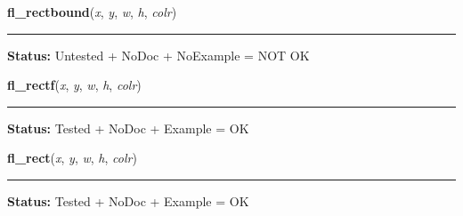     \vspace{0.5ex}

\hspace{.8\funcindent}\begin{boxedminipage}{\funcwidth}

    \raggedright \textbf{fl\_rectbound}(\textit{x}, \textit{y}, \textit{w}, \textit{h}, \textit{colr})

    \vspace{-1.5ex}

    \rule{\textwidth}{0.5\fboxrule}
\setlength{\parskip}{2ex}
\setlength{\parskip}{1ex}
\textbf{Status:} Untested + NoDoc + NoExample = NOT OK



    \end{boxedminipage}

    \label{xformslib:library:fl_rectf}

    \vspace{0.5ex}

\hspace{.8\funcindent}\begin{boxedminipage}{\funcwidth}

    \raggedright \textbf{fl\_rectf}(\textit{x}, \textit{y}, \textit{w}, \textit{h}, \textit{colr})

    \vspace{-1.5ex}

    \rule{\textwidth}{0.5\fboxrule}
\setlength{\parskip}{2ex}
\setlength{\parskip}{1ex}
\textbf{Status:} Tested + NoDoc + Example = OK



    \end{boxedminipage}

    \label{xformslib:library:fl_rect}

    \vspace{0.5ex}

\hspace{.8\funcindent}\begin{boxedminipage}{\funcwidth}

    \raggedright \textbf{fl\_rect}(\textit{x}, \textit{y}, \textit{w}, \textit{h}, \textit{colr})

    \vspace{-1.5ex}

    \rule{\textwidth}{0.5\fboxrule}
\setlength{\parskip}{2ex}
\setlength{\parskip}{1ex}
\textbf{Status:} Tested + NoDoc + Example = OK



    \end{boxedminipage}

